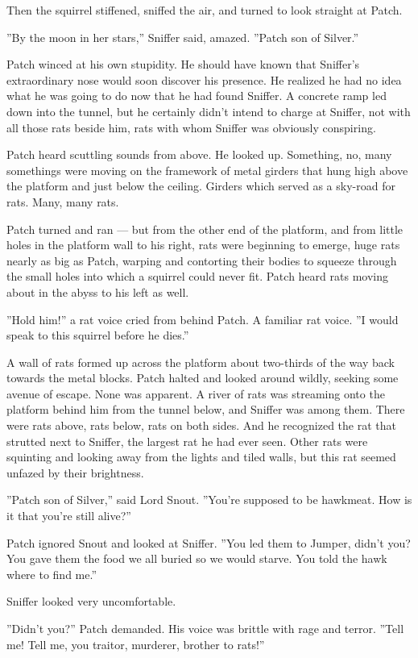 \documentclass[12pt]{book}
\begin{document}
Then the squirrel stiffened, sniffed the air, and turned to look
straight at Patch.

''By the moon in her stars,'' Sniffer said, amazed. ''Patch son of
Silver.''

Patch winced at his own stupidity. He should have known that Sniffer's
extraordinary nose would soon discover his presence. He realized he
had no idea what he was going to do now that he had found Sniffer. A
concrete ramp led down into the tunnel, but he certainly didn't intend
to charge at Sniffer, not with all those rats beside him, rats with
whom Sniffer was obviously conspiring.

Patch heard scuttling sounds from above. He looked up. Something, no,
many somethings were moving on the framework of metal girders that
hung high above the platform and just below the ceiling. Girders which
served as a sky-road for rats. Many, many rats.

Patch turned and ran --- but from the other end of the platform, and
from little holes in the platform wall to his right, rats were
beginning to emerge, huge rats nearly as big as Patch, warping and
contorting their bodies to squeeze through the small holes into which
a squirrel could never fit. Patch heard rats moving about in the abyss
to his left as well.

''Hold him!'' a rat voice cried from behind Patch. A familiar rat
voice. ''I would speak to this squirrel before he dies.''

A wall of rats formed up across the platform about two-thirds of the
way back towards the metal blocks. Patch halted and looked around
wildly, seeking some avenue of escape. None was apparent. A river of
rats was streaming onto the platform behind him from the tunnel below,
and Sniffer was among them. There were rats above, rats below, rats on
both sides. And he recognized the rat that strutted next to Sniffer,
the largest rat he had ever seen. Other rats were squinting and
looking away from the lights and tiled walls, but this rat seemed
unfazed by their brightness.

''Patch son of Silver,'' said Lord Snout. ''You're supposed to be
hawkmeat. How is it that you're still alive?''

Patch ignored Snout and looked at Sniffer. ''You led them to Jumper,
didn't you? You gave them the food we all buried so we would
starve. You told the hawk where to find me.''

Sniffer looked very uncomfortable.

''Didn't you?'' Patch demanded. His voice was brittle with rage and
terror. ''Tell me! Tell me, you traitor, murderer, brother to rats!''
\end{document}
